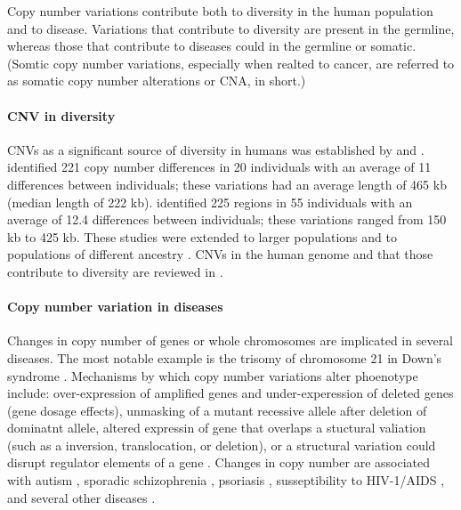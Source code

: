 Copy number variations contribute both to diversity in the human
population and to disease.
Variations that contribute to diversity are present in the germline,
whereas those that contribute to diseases could in the germline or
somatic. (Somtic copy number variations, especially when realted to
cancer, are referred to as somatic copy number alterations or
CNA, in short.)

\paragraph{CNV in diversity}
CNVs as a significant source of diversity in humans was established by
\cite{sebat2004large} and \cite{iafrate2004detection}.
%
\cite{sebat2004large} identified 221 copy number differences in 20
individuals with an average of 11 differences between individuals; these
variations had an average length of 465 kb (median length of 222 kb).
%
\cite{iafrate2004detection} identified 225 regions in 55 individuals
with an average of 12.4 differences between individuals; these
variations ranged from 150 kb to 425 kb.
%
These studies were extended to larger populations and to populations of
different ancestry \citep{redon2006global,li2009whole}.  CNVs in the
human genome and that those contribute to diversity are reviewed in
\citep{freeman2006copy,feuk2006structural,zarrei2015copy}.

\paragraph{Copy number variation in diseases}
Changes in copy number of genes or whole chromosomes are implicated in
several diseases. The most notable example is the trisomy of chromosome
21 in Down's syndrome \citep{antonarakis2004chromosome}.
%
Mechanisms by which copy number variations alter phoenotype include:
over-expression of amplified genes and under-experession of deleted genes
(gene dosage effects), unmasking of a mutant recessive allele after
deletion of dominatnt allele, altered expressin of gene that overlaps a
stuctural valiation (such as a inversion, translocation, or deletion),
or a structural variation could disrupt regulator
elements of a gene \citep{feuk2006structural}.
%
Changes in copy number are associated with autism
\citep{sebat2007strong}, sporadic schizophrenia \citep{xu2008strong},
psoriasis \citep{hollox2008psoriasis}, susseptibility to HIV-1/AIDS
\citep{gonzalez2005influence}, and several other diseases
\citep{stankiewicz2010structural,fanciulli2010gene}.

